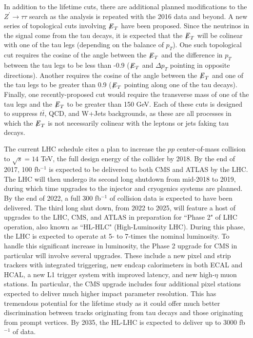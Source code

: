 In addition to the lifetime cuts, there are additional planned modifications to the $Z^\prime\to\tau\tau$ search as the analysis is repeated with the 2016 data and beyond. A new series of topological cuts involving ${\not\mathrel{E}}_T$ have been proposed. Since the neutrinos in the signal come from the tau decays, it is expected that the ${\not\mathrel{E}}_T$ will be colinear with one of the tau legs (depending on the balance of $p_T$). One such topological cut requires the cosine of the angle between the ${\not\mathrel{E}}_T$ and the difference in $p_T$ between the tau legs to be less than -0.9 (${\not\mathrel{E}}_T$ and $\Delta p_T$ pointing in opposite directions). Another requires the cosine of the angle between the ${\not\mathrel{E}}_T$ and one of the tau legs to be greater than 0.9 (${\not\mathrel{E}}_T$ pointing along one of the tau decays). Finally, one recently-proposed cut would require the transverse mass of one of the tau legs and the ${\not\mathrel{E}}_T$ to be greater than 150 GeV. Each of these cuts is designed to suppress $t\bar{t}$, QCD, and W+Jets backgrounds, as these are all processes in which the ${\not\mathrel{E}}_T$ is not necessarily colinear with the leptons or jets faking tau decays.

The current LHC schedule cites a plan to increase the $pp$ center-of-mass collision to $\sqrt{s} = 14$ TeV, the full design energy of the collider by 2018. By the end of 2017, 100 fb$^{-1}$ is expected to be delivered to both CMS and ATLAS by the LHC. The LHC will then undergo its second long shutdown from mid-2018 to 2019, during which time upgrades to the injector and cryogenics systems are planned. By the end of 2022, a full 300 fb$^{-1}$ of collision data is expected to have been delivered. The third long shut down, from 2022 to 2025, will feature a host of upgrades to the LHC, CMS, and ATLAS in preparation for ``Phase 2" of LHC operation, also known as ``HL-HLC" (High-Luminosity LHC).\cite{LHCSchedule} During this phase, the LHC is expected to operate at 5- to 7-times the nominal luminosity. To handle this significant increase in luminosity, the Phase 2 upgrade for CMS in particular will involve several upgrades. These include a new pixel and strip trackers with integrated triggering, new endcap calorimeters in both ECAL and HCAL, a new L1 trigger system with improved latency, and new high-$\eta$ muon stations.\cite{CMSUpgrade} In particular, the CMS upgrade includes four additional pixel stations expected to deliver much higher impact parameter resolution. This has tremendous potential for the lifetime study as it could offer much better discrimination between tracks originating from tau decays and those originating from prompt vertices. By 2035, the HL-LHC is expected to deliver up to 3000 fb$^{-1}$ of data.\cite{LHCSchedule} 

